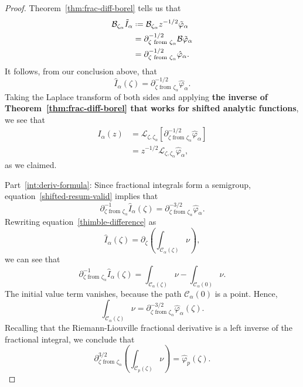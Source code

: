 \documentclass[11pt,a4paper,twoside,leqno,noamsfonts]{amsart}
\numberwithin{equation}{section}
\newcommand{\laplace}{\mathcal{L}}
\begin{document}
\begin{proof}
Theorem~\ref{thm:frac-diff-borel} tells us that
\begin{align*}
\mathcal{B}_{\zeta_\alpha} \tilde{I}_\alpha & \defeq \mathcal{B}_{\zeta_\alpha} z^{-1/2} \tilde{\varphi}_\alpha \\
& = \partial^{-1/2}_{\zeta \text{ from } \zeta_\alpha} \mathcal{B} \tilde{\varphi}_\alpha \\
& = \partial^{-1/2}_{\zeta \text{ from } \zeta_\alpha} \hat{\varphi}_\alpha.
\end{align*}
It follows, from our conclusion above, that
\begin{equation}\label{shifted-resum-valid}
\hat{I}_\alpha(\zeta) = \partial^{-1/2}_{\zeta \text{ from } \zeta_\alpha} \hat{\varphi}_\alpha.
\end{equation}
Taking the Laplace transform of both sides and applying \textbf{the inverse of Theorem~\ref{thm:frac-diff-borel} that works for shifted analytic functions}, we see that
\begin{align*}
I_\alpha(z) & = \laplace_{\zeta, \zeta_\alpha} \left[ \partial^{-1/2}_{\zeta \text{ from } \zeta_\alpha} \hat{\varphi}_\alpha \right] \\
& = z^{-1/2} \laplace_{\zeta, \zeta_\alpha} \hat{\varphi}_\alpha,
\end{align*}
as we claimed.

Part~\eqref{int:deriv-formula}: Since fractional integrals form a semigroup, equation~\eqref{shifted-resum-valid} implies that
\[ \partial^{-1}_{\zeta \text{ from } \zeta_\alpha} \hat{I}_\alpha(\zeta) = \partial^{-3/2}_{\zeta \text{ from } \zeta_\alpha} \hat{\varphi}_\alpha. \]
Rewriting equation~\eqref{thimble-difference} as
\[ \hat{I}_\alpha(\zeta) = \partial_\zeta \left( \int_{\mathcal{C}_\alpha(\zeta)} \nu \right), \]
we can see that
\[ \partial^{-1}_{\zeta \text{ from } \zeta_\alpha} \hat{I}_\alpha(\zeta) = \int_{\mathcal{C}_\alpha(\zeta)} \nu - \int_{\mathcal{C}_\alpha(0)} \nu. \]
The initial value term vanishes, because the path $\mathcal{C}_\alpha(0)$ is a point. Hence,
\[ \int_{\mathcal{C}_\alpha(\zeta)} \nu = \partial^{-3/2}_{\zeta \text{ from } \zeta_\alpha} \hat{\varphi}_\alpha(\zeta). \]
Recalling that the Riemann-Liouville fractional derivative is a left inverse of the fractional integral, we conclude that
\[ \partial^{3/2}_{\zeta \text{ from } \zeta_\alpha} \left( \int_{\mathcal{C}_p(\zeta)} \nu \right) = \hat{\varphi}_p(\zeta). \]
\end{proof}
\end{document}
